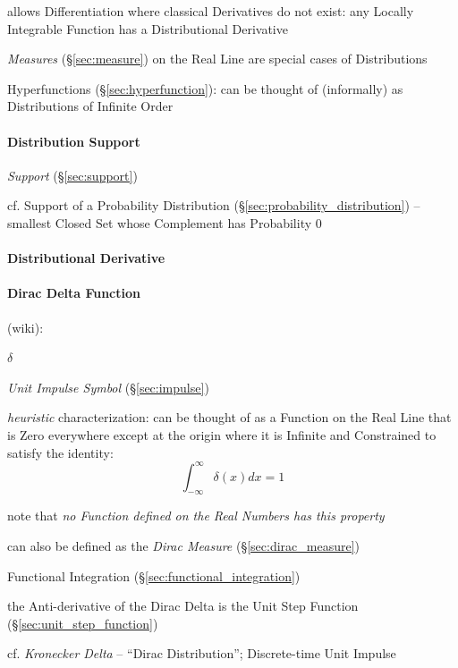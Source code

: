 {allows Differentiation where classical Derivatives do not exist: any Locally
Integrable Function has a Distributional Derivative

\emph{Measures} (\S\ref{sec:measure}) on the Real Line are special cases of
Distributions

Hyperfunctions (\S\ref{sec:hyperfunction}): can be thought of (informally) as
Distributions of Infinite Order



\paragraph{Distribution Support}\label{sec:distribution_support}\hfill

\emph{Support} (\S\ref{sec:support})

cf. Support of a Probability Distribution (\S\ref{sec:probability_distribution})
-- smallest Closed Set whose Complement has Probability $0$



\paragraph{Distributional Derivative}\label{sec:distributional_derivative}\hfill

\paragraph{Dirac Delta Function}\label{sec:dirac_delta}\hfill

(wiki):

$\delta$

\emph{Unit Impulse Symbol} (\S\ref{sec:impulse})

\emph{heuristic} characterization: can be thought of as a Function on the Real
Line that is Zero everywhere except at the origin where it is Infinite and
Constrained to satisfy the identity:
\[
  \int_{-\infty}^\infty \delta(x) dx = 1
\]

note that \emph{no Function defined on the Real Numbers has this property}

can also be defined as the \emph{Dirac Measure} (\S\ref{sec:dirac_measure})

\fist Functional Integration (\S\ref{sec:functional_integration})

the Anti-derivative of the Dirac Delta is the Unit Step Function
(\S\ref{sec:unit_step_function})

cf. \emph{Kronecker Delta} -- ``Dirac Distribution''; Discrete-time Unit Impulse

}
